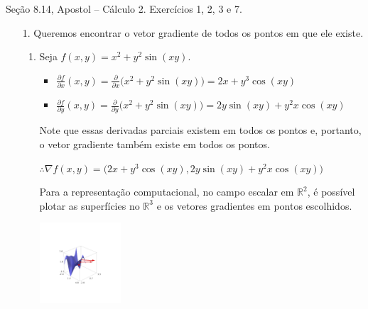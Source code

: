 \documentclass[../main.tex]{subfiles}
\begin{document}
\begin{solucao}
\begin{enumerate}[label=\arabic*.]
\begin{center}
\begin{minipage}{0.45\textwidth}
					\end{minipage}
				\end{center}
			\end{enumerate}
		\end{solucao}
		
		\begin{exercicio}{2}
			Seção 8.14, Apostol -- Cálculo 2. Exercícios 1, 2, 3 e 7.
		\end{exercicio}
		\begin{solucao}
			\begin{enumerate}[label=\arabic.]
				\item[1.] Queremos encontrar o vetor gradiente de todos os pontos em que ele existe.
					\begin{enumerate}[label=\alph*)]
						\item Seja $f(x,y)=x^2+y^2\sin(xy)$.
							\begin{itemize}
								\item $\frac{\partial f}{\partial x}(x,y)=\frac{\partial }{\partial x}\big(x^2+y^2\sin(xy)\big)=2x+y^3\cos(xy)$
								\item $\frac{\partial f}{\partial y}(x,y)=\frac{\partial }{\partial y}\big(x^2+y^2\sin(xy)\big)=2y\sin(xy)+y^2x\cos(xy)$
							\end{itemize}
							Note que essas derivadas parciais existem em todos os pontos e, portanto, o vetor gradiente também existe em todos os pontos.
							
							$\therefore \nabla f(x,y)=\big(2x+y^3\cos(xy), 2y\sin(xy)+y^2x\cos(xy)\big)$
							
							Para a representação computacional, no campo escalar em $\mathbb{R}^2$, é possível plotar as superfícies no $\mathbb{R}^3$ e os vetores gradientes em pontos escolhidos.
							
							\begin{center}
								\includegraphics[width=0.25\textwidth]{imagens/lista04/picture_lista04.02_q02_item01.01.png}
							\end{center}
							

\end{enumerate}
\end{enumerate}
\end{solucao}
\end{document}
